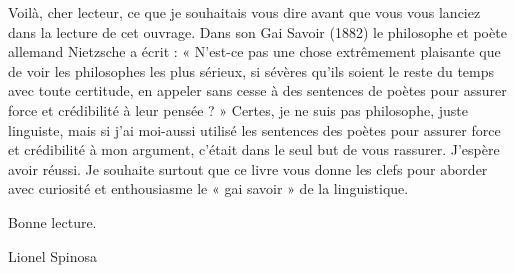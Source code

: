 Voilà, cher lecteur, ce que je souhaitais vous dire avant que vous vous lanciez dans la lecture de cet ouvrage. Dans son Gai Savoir (1882) le philosophe et poète allemand Nietzsche a écrit : « N’est-ce pas une chose extrêmement plaisante que de voir les philosophes les plus sérieux, si sévères qu’ils soient le reste du temps avec toute certitude, en appeler sans cesse à des sentences de poètes pour assurer force et crédibilité à leur pensée ? » Certes, je ne suis pas philosophe, juste linguiste, mais si j’ai moi-aussi utilisé les sentences des poètes pour assurer force et crédibilité à mon argument, c’était dans le seul but de vous rassurer. J’espère avoir réussi. Je souhaite surtout que ce livre vous donne les clefs pour aborder avec curiosité et enthousiasme le « gai savoir » de la linguistique.

Bonne lecture.
\begin{flushright}Lionel Spinosa\end{flushright}
\endgroup

